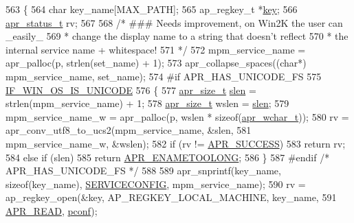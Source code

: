 \begin{DoxyCode}
563 \{
564     \textcolor{keywordtype}{char} key\_name[MAX\_PATH];
565     ap\_regkey\_t *\hyperlink{group__MOD__CACHE_ga11d8023381192746eb96be162398fe1c}{key};
566     \hyperlink{group__apr__errno_gaa5105fa83cc322f09382292db8b47593}{apr\_status\_t} rv;
567 
568     \textcolor{comment}{/* ### Needs improvement, on Win2K the user can \_easily\_}
569 \textcolor{comment}{     * change the display name to a string that doesn't reflect}
570 \textcolor{comment}{     * the internal service name + whitespace!}
571 \textcolor{comment}{     */}
572     mpm\_service\_name = apr\_palloc(p, strlen(set\_name) + 1);
573     apr\_collapse\_spaces((\textcolor{keywordtype}{char}*) mpm\_service\_name, set\_name);
574 \textcolor{preprocessor}{#if APR\_HAS\_UNICODE\_FS}
575     \hyperlink{win32_2apr__arch__misc_8h_a8c631486790f65bd87ed0623a25bdd3d}{IF\_WIN\_OS\_IS\_UNICODE}
576     \{
577         \hyperlink{group__apr__platform_gaaa72b2253f6f3032cefea5712a27540e}{apr\_size\_t} \hyperlink{group__APR__Util__Escaping_ga00eba03f583932b8cdcec6e0847f08b3}{slen} = strlen(mpm\_service\_name) + 1;
578         \hyperlink{group__apr__platform_gaaa72b2253f6f3032cefea5712a27540e}{apr\_size\_t} wslen = \hyperlink{group__APR__Util__Escaping_ga00eba03f583932b8cdcec6e0847f08b3}{slen};
579         mpm\_service\_name\_w = apr\_palloc(p, wslen * \textcolor{keyword}{sizeof}(\hyperlink{apr__arch__utf8_8h_a72c93c6f539bceb60f263635adeb71b6}{apr\_wchar\_t}));
580         rv = apr\_conv\_utf8\_to\_ucs2(mpm\_service\_name, &slen,
581                                    mpm\_service\_name\_w, &wslen);
582         \textcolor{keywordflow}{if} (rv != \hyperlink{group__apr__errno_ga9ee311b7bf1c691dc521d721339ee2a6}{APR\_SUCCESS})
583             \textcolor{keywordflow}{return} rv;
584         \textcolor{keywordflow}{else} \textcolor{keywordflow}{if} (slen)
585             \textcolor{keywordflow}{return} \hyperlink{group__APR__Error_ga3db63b16c2b332efe441e2661f593377}{APR\_ENAMETOOLONG};
586     \}
587 \textcolor{preprocessor}{#endif }\textcolor{comment}{/* APR\_HAS\_UNICODE\_FS */}\textcolor{preprocessor}{}
588 
589     apr\_snprintf(key\_name, \textcolor{keyword}{sizeof}(key\_name), \hyperlink{group__APACHE__MPM__WINNT_ga81acdaeaf223bad3c6a576204e9a1836}{SERVICECONFIG}, mpm\_service\_name);
590     rv = ap\_regkey\_open(&key, AP\_REGKEY\_LOCAL\_MACHINE, key\_name,
591                         \hyperlink{group__apr__file__open__flags_ga0021db78d799d1c8825b701c7efee483}{APR\_READ}, \hyperlink{group__APACHE__CORE__CONFIG_gade454c9a3dc13ac389d15bf30f6c92b2}{pconf});

\end{DoxyCode}
